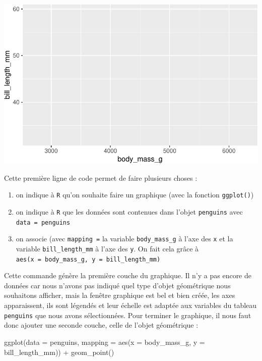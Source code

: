 \documentclass[
  a4paper,
  DIV=11,
  numbers=noendperiod,
  oneside]{scrreprt}
\newenvironment{Shaded}{}{}
\newcommand{\AttributeTok}[1]{\textcolor[rgb]{0.84,0.23,0.29}{#1}}
\newcommand{\FunctionTok}[1]{\textcolor[rgb]{0.44,0.26,0.76}{#1}}
\newcommand{\NormalTok}[1]{\textcolor[rgb]{0.14,0.16,0.18}{#1}}
\newcommand{\SpecialCharTok}[1]{\textcolor[rgb]{0.00,0.36,0.77}{#1}}
\providecommand{\tightlist}{%
  \setlength{\itemsep}{0pt}\setlength{\parskip}{0pt}}\usepackage{longtable,booktabs,array}
\begin{document}
\includegraphics{03-visualization_files/figure-pdf/unnamed-chunk-5-1.pdf}

Cette première ligne de code permet de faire plusieurs choses :

\begin{enumerate}
\def\labelenumi{\arabic{enumi}.}
\tightlist
\item
  on indique à \texttt{R} qu'on souhaite faire un graphique (avec la
  fonction \texttt{ggplot()})
\item
  on indique à \texttt{R} que les données sont contenues dans l'objet
  \texttt{penguins} avec \texttt{data\ =\ penguins}
\item
  on associe (avec \texttt{mapping\ =} la variable
  \texttt{body\_mass\_g} à l'axe des \texttt{x} et la variable
  \texttt{bill\_length\_mm} à l'axe des \texttt{y}. On fait cela grâce à
  \texttt{aes(x\ =\ body\_mass\_g,\ y\ =\ bill\_length\_mm)}
\end{enumerate}

Cette commande génère la première couche du graphique. Il n'y a pas
encore de données car nous n'avons pas indiqué quel type d'objet
géométrique nous souhaitons afficher, mais la fenêtre graphique est bel
et bien créée, les axes apparaissent, ils sont légendés et leur échelle
est adaptée aux variables du tableau \texttt{penguins} que nous avons
sélectionnées. Pour terminer le graphique, il nous faut donc ajouter une
seconde couche, celle de l'objet géométrique :

\begin{Shaded}
\begin{Highlighting}[]
\FunctionTok{ggplot}\NormalTok{(}\AttributeTok{data =}\NormalTok{ penguins, }\AttributeTok{mapping =} \FunctionTok{aes}\NormalTok{(}\AttributeTok{x =}\NormalTok{ body\_mass\_g, }\AttributeTok{y =}\NormalTok{ bill\_length\_mm)) }\SpecialCharTok{+}
  \FunctionTok{geom\_point}\NormalTok{()}
\end{Highlighting}
\end{Shaded}
\end{document}
